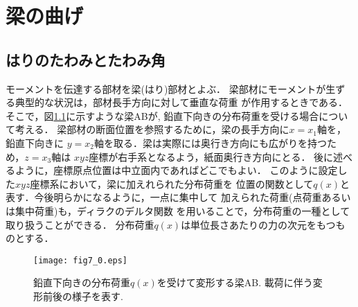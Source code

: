 \documentclass[10pt,a4j]{jbook}
\newlength{\minitwocolumn}
\begin{document}
\newcommand{\fat}[1]{\mbox{\boldmath $#1$}}
\newcommand{\D}{\partial}
\newcommand{\w}{\omega}
\newcommand{\ga}{\alpha}
\newcommand{\gb}{\beta}
\newcommand{\gx}{\xi}
\newcommand{\gz}{\zeta}
\newcommand{\vhat}[1]{\hat{\fat{#1}}}
\newcommand{\spc}{\vspace{0.7\baselineskip}}
\newcommand{\halfspc}{\vspace{0.3\baselineskip}}

\newcommand{\twofig}[2]
 {
   \begin{figure}
     \begin{minipage}[t]{\minitwocolumn}
         \begin{center}   #1
         \end{center}
     \end{minipage}
         \hspace{\columnsep}
     \begin{minipage}[t]{\minitwocolumn}
         \begin{center} #2
         \end{center}
     \end{minipage}
   \end{figure}
 }
\setcounter{chapter}{3}
\chapter{梁の曲げ}
\section{はりのたわみとたわみ角}
モーメントを伝達する部材を梁(はり)部材とよぶ．
梁部材にモーメントが生ずる典型的な状況は，部材長手方向に対して垂直な荷重
が作用するときである．そこで，図\ref{fig:fig7_0}に示すような梁ABが, 
鉛直下向きの分布荷重を受ける場合について考える．
梁部材の断面位置を参照するために，梁の長手方向に$x=x_1$軸を，鉛直下向きに
$y=x_2$軸を取る．梁は実際には奥行き方向にも広がりを持つため，$z=x_3$軸は
$xyz$座標が右手系となるよう，紙面奥行き方向にとる．
後に述べるように，座標原点位置は中立面内であればどこでもよい．
このように設定した$xyz$座標系において，梁に加えれられた分布荷重を
位置の関数として$q(x)$と表す．今後明らかになるように，一点に集中して
加えられた荷重(点荷重あるいは集中荷重)も，ディラクのデルタ関数
を用いることで，分布荷重の一種として取り扱うことができる．
分布荷重$q(x)$は単位長さあたりの力の次元をもつものとする．
\begin{figure}[h]
	\begin{center}
	\texttt{[image: fig7\_0.eps]} 
	\end{center}
	\caption{
		鉛直下向きの分布荷重$q(x)$を受けて変形する梁AB.
		載荷に伴う変形前後の様子を表す. 
	} 
	\label{fig:fig7_0}
\end{figure}
\end{document}
